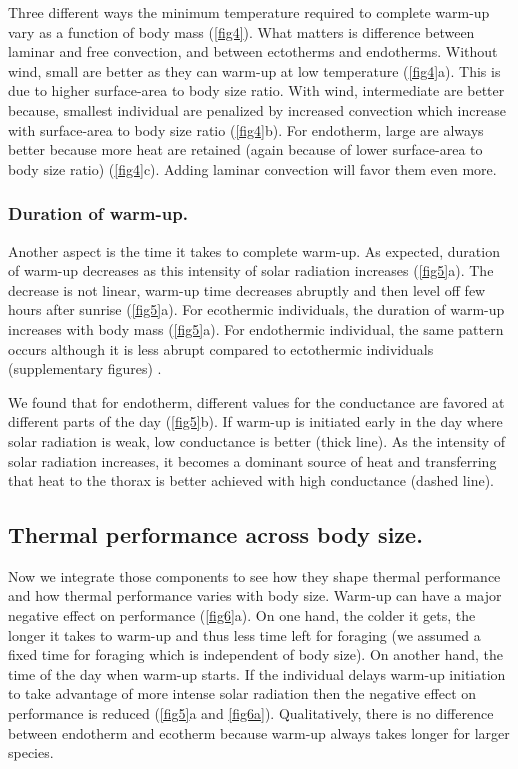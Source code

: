 Three different ways the minimum temperature required to complete warm-up vary as a function of body mass (\cref{fig4}).
What matters is difference between laminar and free convection, and between ectotherms  and endotherms.
Without wind, small are better as they can warm-up at low temperature (\cref{fig4}a).
This is due to higher surface-area to body size ratio.
With wind, intermediate are better because, smallest individual are penalized by increased convection which increase with surface-area to body size ratio (\cref{fig4}b).
For endotherm, large are always better because more heat are retained (again because of lower surface-area to body size ratio) (\cref{fig4}c).
Adding laminar convection will favor them even more.

\subsubsection*{Duration of warm-up.}
Another aspect is the time it takes to complete warm-up.
As expected, duration of warm-up decreases as this intensity of solar radiation increases (\cref{fig5}a).
The decrease is not linear, warm-up time decreases abruptly and then level off few hours after sunrise (\cref{fig5}a).
For ecothermic individuals, the duration of warm-up increases with body mass (\cref{fig5}a).
For endothermic individual, the same pattern occurs although it is less abrupt compared to ectothermic individuals (supplementary figures) .

We found that for endotherm, different values for the conductance are favored at different parts of the day (\cref{fig5}b).
If warm-up is initiated early in the day where solar radiation is weak, low conductance is better (thick line).
As the intensity of solar radiation increases, it becomes a dominant source of heat and transferring that heat to the thorax is better achieved with high conductance (dashed line).

\subsection*{Thermal performance across body size.}
Now we integrate those components to see how they shape thermal performance and how thermal performance varies with body size.
Warm-up can have a major negative effect on performance (\cref{fig6}a).
On one hand, the colder it gets, the longer it takes to warm-up and thus less time left for foraging (we assumed a fixed time for foraging which is independent of body size).
On another hand, the time of the day when warm-up starts.
If the individual delays warm-up initiation to take advantage of more intense solar radiation then the negative effect on performance is reduced (\cref{fig5}a and \cref{fig6a}).
Qualitatively, there is no difference between endotherm and ecotherm because warm-up always takes longer for larger species. 

